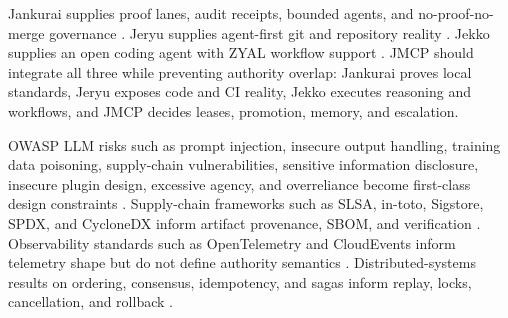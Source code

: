 \documentclass[journal,onecolumn]{IEEEtran}
\begin{document}
Jankurai supplies proof lanes, audit receipts, bounded agents, and no-proof-no-merge governance \cite{jankurai}. Jeryu supplies agent-first git and repository reality \cite{jeryu}. Jekko supplies an open coding agent with ZYAL workflow support \cite{jekko}. JMCP should integrate all three while preventing authority overlap: Jankurai proves local standards, Jeryu exposes code and CI reality, Jekko executes reasoning and workflows, and JMCP decides leases, promotion, memory, and escalation.

OWASP LLM risks such as prompt injection, insecure output handling, training data poisoning, supply-chain vulnerabilities, sensitive information disclosure, insecure plugin design, excessive agency, and overreliance become first-class design constraints \cite{owasp}. Supply-chain frameworks such as SLSA, in-toto, Sigstore, SPDX, and CycloneDX inform artifact provenance, SBOM, and verification \cite{slsa,intoto,sigstore,spdx,cyclonedx}. Observability standards such as OpenTelemetry and CloudEvents inform telemetry shape but do not define authority semantics \cite{otel,cloudevents}. Distributed-systems results on ordering, consensus, idempotency, and sagas inform replay, locks, cancellation, and rollback \cite{lamport,paxos,raft,sagas}.
\end{document}
